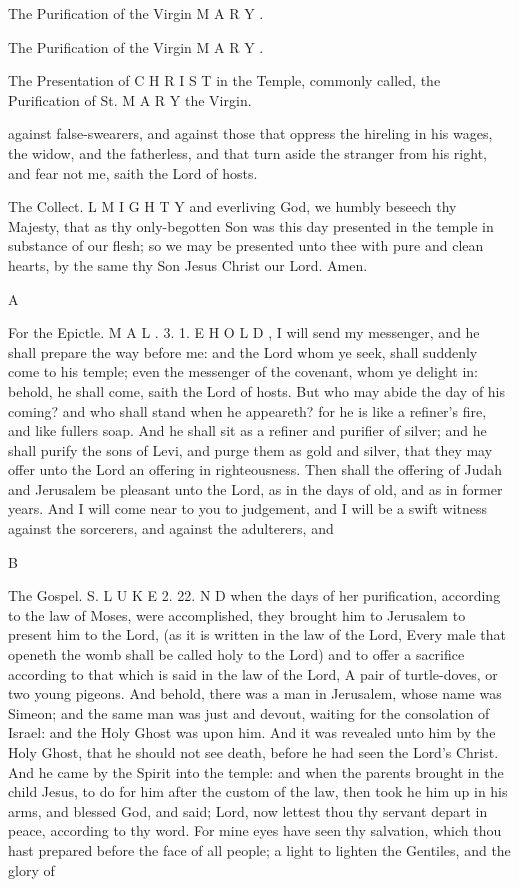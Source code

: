 The Purification of the Virgin M A R Y .

The Purification of the Virgin M A R Y .

The Presentation of C H R I S T in the Temple, commonly called, the Purification of St. M A R Y the Virgin.

against false-swearers, and against those that oppress the hireling in his wages, the widow, and the fatherless, and that turn aside the stranger from his right, and fear not me, saith the Lord of hosts.

The Collect. L M I G H T Y and everliving God, we humbly beseech thy Majesty, that as thy only-begotten Son was this day presented in the temple in substance of our flesh; so we may be presented unto thee with pure and clean hearts, by the same thy Son Jesus Christ our Lord. Amen.

A

For the Epictle. M A L . 3. 1. E H O L D , I will send my messenger, and he shall prepare the way before me: and the Lord whom ye seek, shall suddenly come to his temple; even the messenger of the covenant, whom ye delight in: behold, he shall come, saith the Lord of hosts. But who may abide the day of his coming? and who shall stand when he appeareth? for he is like a refiner’s fire, and like fullers soap. And he shall sit as a refiner and purifier of silver; and he shall purify the sons of Levi, and purge them as gold and silver, that they may offer unto the Lord an offering in righteousness. Then shall the offering of Judah and Jerusalem be pleasant unto the Lord, as in the days of old, and as in former years. And I will come near to you to judgement, and I will be a swift witness against the sorcerers, and against the adulterers, and

B

The Gospel. S. L U K E 2. 22. N D when the days of her purification, according to the law of Moses, were accomplished, they brought him to Jerusalem to present him to the Lord, (as it is written in the law of the Lord, Every male that openeth the womb shall be called holy to the Lord) and to offer a sacrifice according to that which is said in the law of the Lord, A pair of turtle-doves, or two young pigeons. And behold, there was a man in Jerusalem, whose name was Simeon; and the same man was just and devout, waiting for the consolation of Israel: and the Holy Ghost was upon him. And it was revealed unto him by the Holy Ghost, that he should not see death, before he had seen the Lord’s Christ. And he came by the Spirit into the temple: and when the parents brought in the child Jesus, to do for him after the custom of the law, then took he him up in his arms, and blessed God, and said; Lord, now lettest thou thy servant depart in peace, according to thy word. For mine eyes have seen thy salvation, which thou hast prepared before the face of all people; a light to lighten the Gentiles, and the glory of

